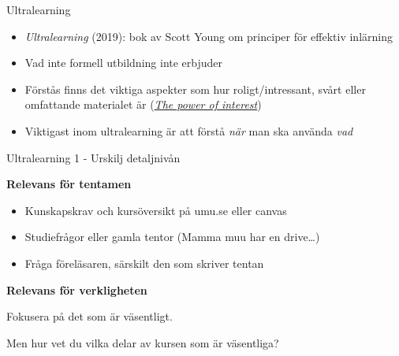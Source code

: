 \documentclass[presentation]{beamer}
\begin{document}
\begin{frame}{Ultralearning}


\begin{itemize}

  \item \textit{Ultralearning} (2019): bok av Scott Young om principer för effektiv inlärning


\item Vad inte formell utbildning inte erbjuder


\item Förstås finns det viktiga aspekter som hur roligt/intressant, svårt eller omfattande materialet är (\href{https://www.youtube.com/watch?v=167se17RNHw}{\textit{The power of interest}})


\item Viktigast inom ultralearning är att förstå \emph{när} man ska använda \emph{vad}
\end{itemize}
\end{frame}

\begin{frame}{Ultralearning 1 - Urskilj detaljnivån}

\textbf{Relevans för tentamen}
\begin{itemize}
    \item Kunskapskrav och kursöversikt på umu.se eller canvas
    \item Studiefrågor eller gamla tentor (Mamma muu har en drive\ldots)
    \item Fråga föreläsaren, särskilt den som skriver tentan
\end{itemize}

\textbf{Relevans för verkligheten}

Fokusera på det som är väsentligt.

Men hur vet du vilka delar av kursen som är väsentliga?

\end{frame}
\end{document}
